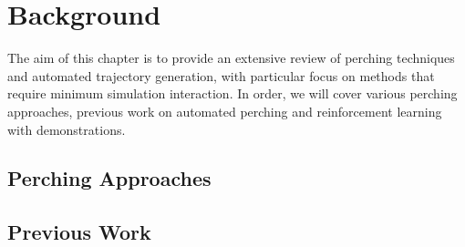 \chapter{Background}


The aim of this chapter is to provide an extensive review of perching techniques and automated trajectory generation, with particular focus on methods that require minimum simulation interaction.
In order, we will cover various perching approaches, previous work on automated perching and reinforcement learning with demonstrations.

\section{Perching Approaches}

\section{Previous Work}


